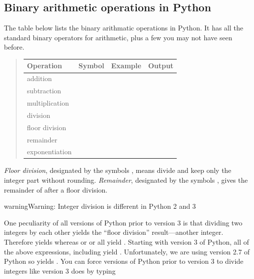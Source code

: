 \documentclass[letterpaper,10pt,english]{sphinxmanual}
\begin{document}
\subsection{Binary arithmetic operations in Python}
\label{chap2/chap2_basics:binary-arithmetic-operations-in-python}
The table below lists the binary arithmatic operations in Python.  It has all the standard binary operators for arithmetic, plus a few you may not have seen before.
\begin{quote}

\begin{tabulary}{\linewidth}{|L|L|L|L|}
\hline
\textbf{
\textbf{Operation}
} & \textbf{
\textbf{Symbol}
} & \textbf{
\textbf{Example}
} & \textbf{
\textbf{Output}
}\\\hline

addition
 & 
\code{+}
 & 
 & 
\\\hline

subtraction
 & 
\code{-}
 & 
 & 
\\\hline

multiplication
 & 
\code{*}
 & 
 & 
\\\hline

division
 & 
\code{/}
 & 
 & 
\\\hline

floor division
 & 
\code{//}
 & 
 & 
\\\hline

remainder
 & 
\code{\%}
 & 
 & 
\\\hline

exponentiation
 & 
\code{**}
 & 
 & 
\\\hline
\end{tabulary}

\end{quote}

\emph{Floor division}, designated by the symbols \code{//}, means divide and keep only the integer part without rounding.  \emph{Remainder}, designated by the symbols \code{\%}, gives the remainder of after a floor division.

\begin{notice}{warning}{Warning:}
Integer division is different in Python 2 and 3
\end{notice}

One peculiarity of all versions of Python prior to version 3 is that dividing two integers by each other yields the ``floor division'' result---another integer.  Therefore  yields  whereas  or  or  all yield .  Starting with version 3 of Python, all of the above expressions, including  yield .  Unfortunately, we are using version 2.7 of Python so  yields .  You can force versions of Python prior to version 3 to divide integers like version 3 does by typing
\end{document}
